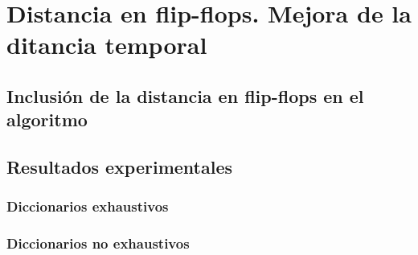 \chapter{Distancia en flip-flops. Mejora de la ditancia temporal}
\label{ch:FFdist}

\lettrine[lraise=-0.1, lines=2, loversize=0.2]{}{}


\section{Inclusión de la distancia en flip-flops en el algoritmo}
\label{sec:FusionFF}


\section{Resultados experimentales}
\label{sec:FFResults}


\subsection{Diccionarios exhaustivos}
\label{subsec:FFDicExhaust}


\subsection{Diccionarios no exhaustivos}
\label{subsec:FFDicNoExhaust}




\endinput
